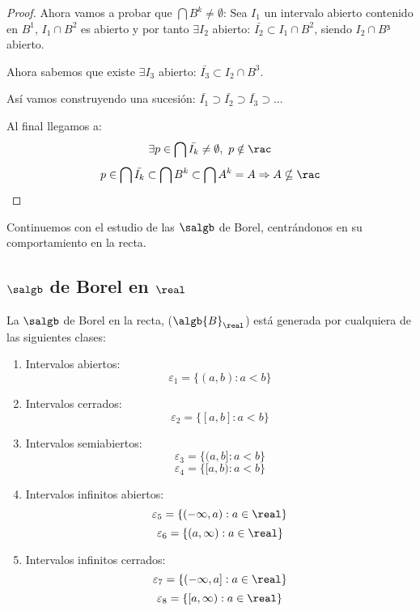 \documentclass{apuntes}
\begin{document}
\begin{example}
\begin{itemize}
\begin{proof}
Ahora vamos a probar que $\bigcap B^k \neq \emptyset$:
Sea $I_1$ un intervalo abierto contenido en $B^1$, $I_1\cap B^2$ es abierto y por tanto $\exists I_2$ abierto: $\bar{I_2} \subset I_1 \cap B^2$, siendo $I_2 \cap B³$ abierto.

Ahora sabemos que existe $\exists I_3$ abierto: $\bar{I_3} \subset I_2 \cap B^3$.

Así vamos construyendo una sucesión: $\bar{I_1}\supset\bar{I_2}\supset\bar{I_3}\supset...$

Al final llegamos a:
\[\exists p \in \bigcap \bar{I_k} \neq \emptyset, \ p \notin \rac\]
\[p \in \bigcap \bar{I_k} \subset \bigcap B^k \subset \bigcap A^k = A \Rightarrow A\nsubseteq \rac\]

\end{proof}
\end{itemize}
\end{example}

Continuemos con el estudio de las $\salgb$ de Borel, centrándonos en su comportamiento en la recta.

\subsection{$\salgb$ de Borel en $\real$}
\begin{theorem}
La $\salgb$ de Borel en la recta, ($\algb{B}_\real$) está generada por cualquiera de las siguientes clases:
\begin{enumerate}
\item Intervalos abiertos:
\[\varepsilon_1=\lbrace (a,b): a < b\rbrace\]
\item Intervalos cerrados:
\[\varepsilon_2=\lbrace [a,b]: a < b\rbrace\]
\item Intervalos semiabiertos:
\[\varepsilon_3=\lbrace (a,b]: a < b\rbrace\]
\[\varepsilon_4=\lbrace [a,b): a < b\rbrace\]

\item Intervalos infinitos abiertos:
\[\varepsilon_5=\lbrace (-\infty,a): a \in \real \rbrace\]
\[\varepsilon_6=\lbrace (a, \infty): a \in \real \rbrace\]

\item Intervalos infinitos cerrados:
\[\varepsilon_7=\lbrace (-\infty,a]: a \in \real \rbrace\]
\[\varepsilon_8=\lbrace [a, \infty): a \in \real \rbrace\]
\end{enumerate}
\end{theorem}
\end{document}
